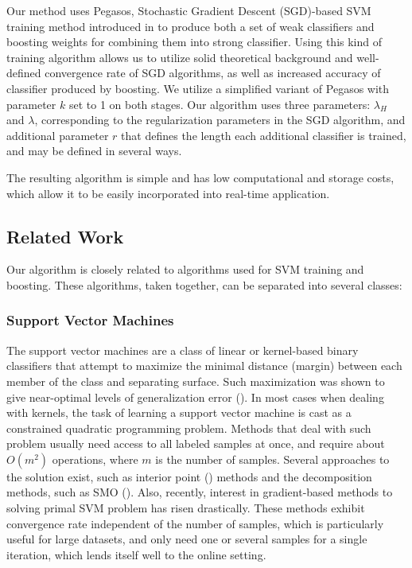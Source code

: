 \documentclass[10pt,twocolumn, a4paper]{article}
\begin{document}
Our method uses Pegasos, Stochastic Gradient Descent (SGD)-based SVM training method introduced in \cite{Pegasos} to produce both a set of weak classifiers and boosting weights for combining them into strong classifier. Using this kind of training algorithm allows us to utilize solid theoretical background and well-defined convergence rate of SGD algorithms, as well as increased accuracy of classifier produced by boosting. We utilize a simplified variant of Pegasos with parameter $k$ set to 1 on both stages. Our algorithm uses three parameters: $\lambda_H$ and $\lambda$, corresponding to the regularization parameters in the SGD algorithm, and additional parameter $r$ that defines the length each additional classifier is trained, and may be defined in several ways.

The resulting algorithm is simple and has low computational and storage costs, which allow it to be easily incorporated into real-time application.

\subsection{Related Work}
Our algorithm is closely related to algorithms used for SVM training and boosting. These algorithms, taken together, can be separated into several classes:
\subsubsection{Support Vector Machines}
The support vector machines are a class of linear or kernel-based binary classifiers that attempt to maximize the minimal distance (margin) between each member of the class and separating surface. Such maximization was shown to give near-optimal levels of generalization error (\cite{Vapnik}). In most cases when dealing with kernels, the task of learning a support vector machine is cast as a constrained quadratic programming problem. Methods that deal with such problem usually need access to all labeled samples at once, and require about $O(m^2)$ operations, where $m$ is the number of samples. Several approaches to the solution exist, such as interior point (\cite{IP}) methods and the decomposition methods, such as SMO (\cite{SMO}).
Also, recently, interest in gradient-based methods to solving primal SVM problem has risen drastically. These methods exhibit convergence rate independent of the number of samples, which is particularly useful for large datasets, and only need one or several samples for a single iteration, which lends itself well to the online setting. 
\end{document}
